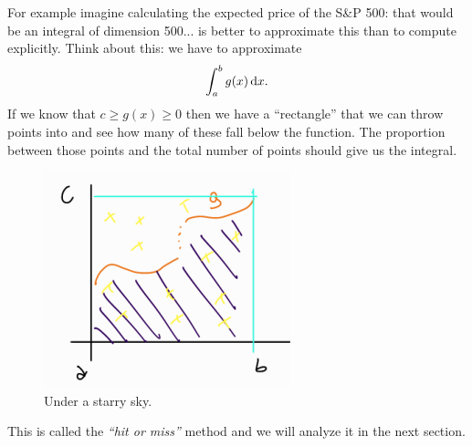 \documentclass[12pt]{report}
\begin{document}
For example imagine calculating the expected price of the S\&P 500: that would be an integral of dimension 500... is better to approximate this than to compute explicitly.
Think about this: we have to approximate
	\begin{equation*}
		\int_{a}^{b}g(x)\mathop{}\!\mathrm{d} x.
	\end{equation*}
	If we know that $c\geq g(x)\geq0$ then we have a ``rectangle'' that we can throw points into and see how many of these fall below the function. The proportion between those points and the total number of points should give us the integral.
	\begin{figure}[H]
		\centering
		\includegraphics[width=0.5\linewidth]{img/screenshot063}
		\caption{Under a starry sky.}
		\label{fig:screenshot063}
	\end{figure}
	This is called the \emph{``hit or miss''} method and we will analyze it in the next section.
\end{document}
